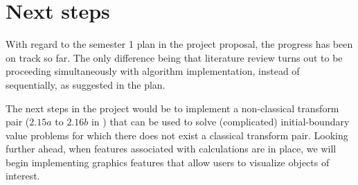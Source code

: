\documentclass[11pt, oneside, a4paper]{article}
\begin{document}
\section{Next steps}
With regard to the semester 1 plan in the project proposal, the progress has been on track so far. The only difference being that literature review turns out to be proceeding simultaneously with algorithm implementation, instead of sequentially, as suggested in the plan.

The next steps in the project would be to implement a non-classical transform pair ($2.15a$ to $2.16b$ in \cite[p.10]{Smith2016}) that can be used to solve (complicated) initial-boundary value problems for which there does not exist a classical transform pair. Looking further ahead, when features associated with calculations are in place, we will begin implementing graphics features that allow users to visualize objects of interest.

\newpage

% 

\end{document}

